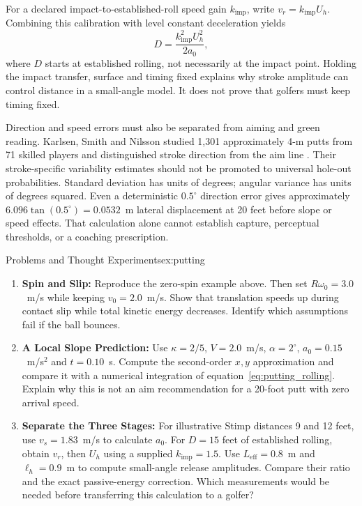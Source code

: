 For a declared impact-to-established-roll speed gain $k_{\mathrm{imp}}$, write $v_r=k_{\mathrm{imp}}U_h$. Combining this calibration with level constant deceleration yields
\begin{equation}
D=\frac{k_{\mathrm{imp}}^2U_h^2}{2a_0},
\end{equation}
where $D$ starts at established rolling, not necessarily at the impact point. Holding the impact transfer, surface and timing fixed explains why stroke amplitude can control distance in a small-angle model. It does not prove that golfers must keep timing fixed.

Direction and speed errors must also be separated from aiming and green reading. Karlsen, Smith and Nilsson studied 1,301 approximately 4-m putts from 71 skilled players and distinguished stroke direction from the aim line \cite{karlsen2008putting}. Their stroke-specific variability estimates should not be promoted to universal hole-out probabilities. Standard deviation has units of degrees; angular variance has units of degrees squared. Even a deterministic $0.5^\circ$ direction error gives approximately $6.096\tan(0.5^\circ)=0.0532$~m lateral displacement at 20 feet before slope or speed effects. That calculation alone cannot establish capture, perceptual thresholds, or a coaching prescription.

\begin{exercises}{Problems and Thought Experiments}{ex:putting}
\begin{enumerate}
\item \textbf{Spin and Slip:} Reproduce the zero-spin example above. Then set $R\omega_0=3.0$~m/s while keeping $v_0=2.0$~m/s. Show that translation speeds up during contact slip while total kinetic energy decreases. Identify which assumptions fail if the ball bounces.
\item \textbf{A Local Slope Prediction:} Use $\kappa=2/5$, $V=2.0$~m/s, $\alpha=2^\circ$, $a_0=0.15$~m/s$^2$ and $t=0.10$~s. Compute the second-order $x,y$ approximation and compare it with a numerical integration of equation~\eqref{eq:putting_rolling}. Explain why this is not an aim recommendation for a 20-foot putt with zero arrival speed.
\item \textbf{Separate the Three Stages:} For illustrative Stimp distances 9 and 12 feet, use $v_s=1.83$~m/s to calculate $a_0$. For $D=15$ feet of established rolling, obtain $v_r$, then $U_h$ using a supplied $k_{\mathrm{imp}}=1.5$. Use $L_{\mathrm{eff}}=0.8$~m and $\ell_h=0.9$~m to compute small-angle release amplitudes. Compare their ratio and the exact passive-energy correction. Which measurements would be needed before transferring this calculation to a golfer?
\end{enumerate}
\end{exercises}

